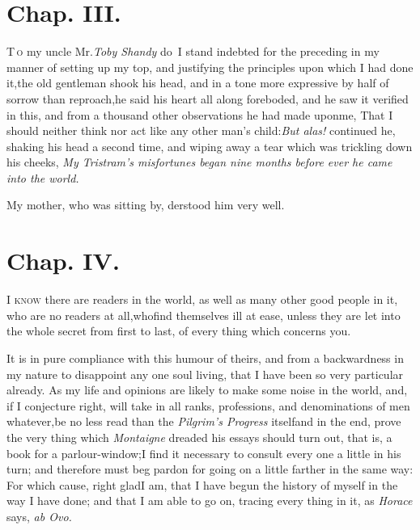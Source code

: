 \documentclass{article}
\begin{document}
\newpage
\section{Chap. III.}

\lettrine{T}{\,o} my uncle Mr.\@ \textit{Toby Shandy} do~I\break
stand indebted for the preceding\break
{}
\break
in my manner of
setting up my top, and justifying the principles upon which I had
done it,\tsk  the old gentleman shook his head, and in a tone more
expressive by half of sorrow than reproach,\tsk  he said his heart
all along foreboded, and he saw it verified in this, and from a
thousand other observations he had made upon\pb me, That I should
neither think nor act like any other man’s
child:\tsk  \textit{But alas!} continued he, shaking his head a
second time, and wiping away a tear which was trickling down his
cheeks, \textit{My Tristram’s misfortunes began nine months before
ever he came into the world.}

\tsh My mother, who was sitting by,\break
{}
derstood him very well.

\section{Chap. IV.}

\lettrine{I}{ know} there are readers in the
world, as well as many other good people in it, who are no readers
at all,\tsk  who\pb find themselves ill at ease, unless they are let
into the whole secret from first to last, of every thing which
concerns you.

It is in pure compliance with this humour of theirs, and from a
backwardness in my nature to disappoint any one soul living, that I
have been so very particular already. As my life and opinions are
likely to make some noise in the world, and, if I conjecture right,
will take in all ranks, professions, and denominations of men
whatever,\tsk  be no less read than the \textit{Pilgrim’s
Progress} itself\tsk  and in the end, prove the very thing
which \textit{Montaigne} dreaded his essays should turn out, that is,
a book for a parlour-window;\tsk  I find it necessary to consult
every one a little in his turn; and therefore must beg pardon for going on a little farther in the same way:
For which cause, right glad\pb I am, that I have begun the history of
myself in the way I have done; and that I am able to go on, tracing
every thing in it, as \textit{Horace} says, \textit{ab Ovo.}
\end{document}
